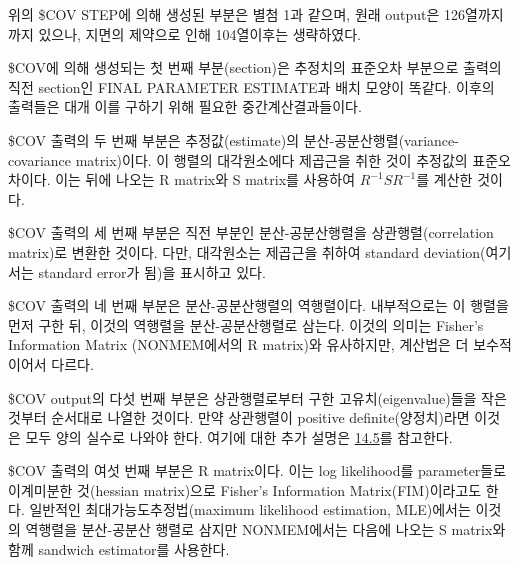 \documentclass[
  11pt,
  krantz2,
  a4paper]{krantz}
\theoremstyle{definition}
\theoremstyle{definition}
\theoremstyle{definition}
\theoremstyle{remark}
\begin{document}
위의 \$COV STEP에 의해 생성된 부분은 별첨 1과 같으며, 원래 output은 126열까지까지 있으나, 지면의 제약으로 인해 104열이후는 생략하였다.

\$COV에 의해 생성되는 첫 번째 부분(section)은 추정치의 표준오차 부분으로 출력의 직전 section인 FINAL PARAMETER ESTIMATE과 배치 모양이 똑같다. 이후의 출력들은 대개 이를 구하기 위해 필요한 중간계산결과들이다.

\$COV 출력의 두 번째 부분은 추정값(estimate)의 분산-공분산행렬(variance-covariance matrix)이다. 이 행렬의 대각원소에다 제곱근을 취한 것이 추정값의 표준오차이다. 이는 뒤에 나오는 R matrix와 S matrix를 사용하여 \(R^{- 1}SR^{- 1}\)를 계산한 것이다.

\$COV 출력의 세 번째 부분은 직전 부분인 분산-공분산행렬을 상관행렬(correlation matrix)로 변환한 것이다. 다만, 대각원소는 제곱근을 취하여 standard deviation(여기서는 standard error가 됨)을 표시하고 있다.

\$COV 출력의 네 번째 부분은 분산-공분산행렬의 역행렬이다. 내부적으로는 이 행렬을 먼저 구한 뒤, 이것의 역행렬을 분산-공분산행렬로 삼는다. 이것의 의미는 Fisher's Information Matrix (NONMEM에서의 R matrix)와 유사하지만, 계산법은 더 보수적이어서 다르다.

\$COV output의 다섯 번째 부분은 상관행렬로부터 구한 고유치(eigenvalue)들을 작은 것부터 순서대로 나열한 것이다. 만약 상관행렬이 positive definite(양정치)라면 이것은 모두 양의 실수로 나와야 한다. 여기에 대한 추가 설명은 \protect\hyperlink{Theoph}{14.5}를 참고한다.

\$COV 출력의 여섯 번째 부분은 R matrix이다. 이는 log likelihood를 parameter들로 이계미분한 것(hessian matrix)으로 Fisher's Information Matrix(FIM)이라고도 한다. 일반적인 최대가능도추정법(maximum likelihood estimation, MLE)에서는 이것의 역행렬을 분산-공분산 행렬로 삼지만 NONMEM에서는 다음에 나오는 S matrix와 함께 sandwich estimator를 사용한다.
\end{document}
